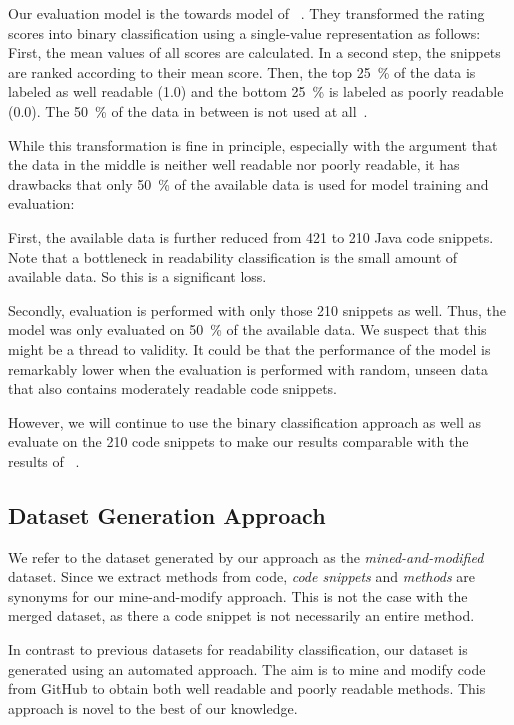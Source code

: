 \documentclass[%
class=scrreprt,
chapterprefix=false,%
open=right,%
twoside=false,%
paper=a4,%
logofile={Logo\_zentral\_farbig\_EN.png},%
thesistype=master,%
UKenglish,%
]{se2thesis}
\theoremstyle{definition}
\begin{document}
	Our evaluation model is the towards model of \citeauthor{mi2022towards}~\cite{mi2022towards}. They transformed the rating scores into binary classification using a single-value representation as follows: First, the mean values of all scores are calculated. In a second step, the snippets are ranked according to their mean score. Then, the top 25~\% of the data is labeled as well readable (1.0) and the bottom 25~\% is labeled as poorly readable (0.0). The 50~\% of the data in between is not used at all~\cite{mi2022towards}.
	
	While this transformation is fine in principle, especially with the argument that the data in the middle is neither well readable nor poorly readable, it has drawbacks that only 50~\% of the available data is used for model training and evaluation:
	
	First, the available data is further reduced from 421 to 210 Java code snippets. Note that a bottleneck in readability classification is the small amount of available data. So this is a significant loss.
	
	Secondly, evaluation is performed with only those 210 snippets as well. Thus, the model was only evaluated on 50~\% of the available data. We suspect that this might be a thread to validity. It could be that the performance of the model is remarkably lower when the evaluation is performed with random, unseen data that also contains moderately readable code snippets.
	
	However, we will continue to use the binary classification approach as well as evaluate on the 210 code snippets to make our results comparable with the results of \citeauthor{mi2022towards}~\cite{mi2022towards}.
	
\subsection{Dataset Generation Approach} \label{Dataset Generation Approach}
	We refer to the dataset generated by our approach as the \textit{mined-and-modified} dataset.
	Since we extract methods from code, \textit{code snippets} and \textit{methods} are synonyms for our mine-and-modify approach. This is not the case with the merged dataset, as there a code snippet is not necessarily an entire method.

	In contrast to previous datasets for readability classification, our dataset is generated using an automated approach. The aim is to mine and modify code from GitHub to obtain both well readable and poorly readable methods. This approach is novel to the best of our knowledge. 
	
\end{document}
